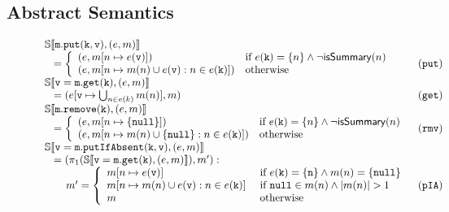 \subsection{Abstract Semantics}
\label{sect:abstractsemantics}

\begin{figure*}
\[
\begin{array}{ll}
  \mathbb{S}\llbracket \mathtt{m.put(k, v)}, (e, m) \rrbracket\\
  \;\;\;=\left\{
\begin{array}{ll}
(e, m[n \mapsto e(\mathtt{v})]) & \textrm{if } e(\mathtt{k})=\{n\} \land \neg \mathsf{isSummary}(n)\\
(e, m[n \mapsto m(n) \cup e(\mathtt{v}) : n \in e(\mathtt{k})]) & \textrm{otherwise}\\
\end{array}
\right. & (\mathtt{put})\\
\mathbb{S}\llbracket \mathtt{v=m.get(k)}, (e, m) \rrbracket\\
\;\;\;= (e[\mathtt{v} \mapsto \bigcup_{n \in e(k)} m(n)], m) & (\mathtt{get})\\
\mathbb{S}\llbracket \mathtt{m.remove(k)}, (e, m) \rrbracket\\
\;\;\;=  \left\{
\begin{array}{ll}
(e, m[n \mapsto \{\mathtt{null}\}]) & \textrm{if } e(\mathtt{k})=\{n\} \land \neg \mathsf{isSummary}(n)\\
(e, m[n \mapsto m(n) \cup \{\mathtt{null}\} : n \in e(\mathtt{k})]) & \textrm{otherwise}\\
\end{array}
\right. & (\mathtt{rmv})\\ 
\mathbb{S}\llbracket \mathtt{v = m.putIfAbsent(k, v)}, (e, m) \rrbracket\\
\;\;\;=  (\pi_1(\mathbb{S}\llbracket \mathtt{v = m.get(k)}, (e, m) \rrbracket), m') : & \\
\hspace{20pt} 
m'=
\left\{
\begin{array}{ll}
m[n \mapsto e(\mathtt{v})] & \textrm{ if } e(\mathtt{k})=\{\mathtt{n}\} \land m(n) = \{\mathtt{null}\}\\
m[n \mapsto m(n) \cup e(\mathtt{v}) : n \in e(\mathtt{k})] & \textrm{ if } \mathtt{null} \in m(n) \land |m(n)| > 1\\
m & \textrm{ otherwise}\\
\end{array}
\right. & (\mathtt{pIA})\\

\end{array}\]
\end{figure*}
